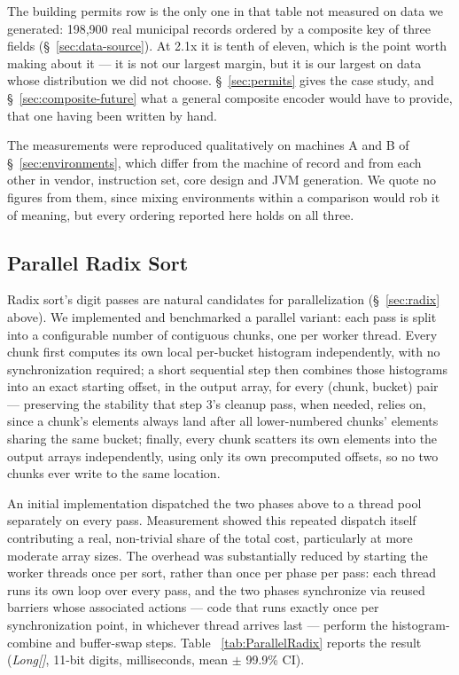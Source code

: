 \documentclass[twoside,leqno,twocolumn]{article}
\begin{document}
The building permits row is the only one in that table not measured on data we generated:
198,900 real municipal records ordered by a composite key of three fields (\S~\ref{sec:data-source}).
At 2.1x it is tenth of eleven, which is the point worth making about it --- it is not our largest
margin, but it is our largest on data whose distribution we did not choose.
\S~\ref{sec:permits} gives the case study, and \S~\ref{sec:composite-future} what a general
composite encoder would have to provide, that one having been written by hand.

The measurements were reproduced qualitatively on machines A and B of \S~\ref{sec:environments},
which differ from the machine of record and from each other in vendor, instruction set, core design and
JVM generation.
We quote no figures from them, since mixing environments within a comparison would rob it of meaning,
but every ordering reported here holds on all three.

\subsection{Parallel Radix Sort}
\label{sec:parallel-radix}

Radix sort's digit passes are natural candidates for parallelization (\S~\ref{sec:radix} above).
We implemented and benchmarked a parallel variant:
each pass is split into a configurable number of contiguous chunks, one per worker thread.
Every chunk first computes its own local per-bucket histogram independently, with no synchronization required;
a short sequential step then combines those histograms into an exact starting offset, in the output array,
for every (chunk, bucket) pair — preserving the stability that step 3's cleanup pass, when needed, relies on,
since a chunk's elements always land after all lower-numbered chunks' elements sharing the same bucket;
finally, every chunk scatters its own elements into the output arrays independently,
using only its own precomputed offsets, so no two chunks ever write to the same location.

An initial implementation dispatched the two phases above to a thread pool separately on every pass.
Measurement showed this repeated dispatch itself contributing a real, non-trivial share of the total cost,
particularly at more moderate array sizes.
The overhead was substantially reduced by starting the worker threads once per sort,
rather than once per phase per pass:
each thread runs its own loop over every pass, and the two phases synchronize via reused barriers whose associated actions —
code that runs exactly once per synchronization point, in whichever thread arrives last —
perform the histogram-combine and buffer-swap steps.
Table ~\ref{tab:ParallelRadix} reports the result (\textit{Long[]}, 11-bit digits, milliseconds, mean $\pm$ 99.9\% CI).
\end{document}
